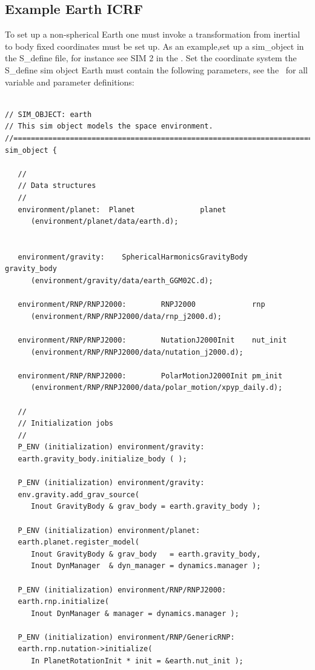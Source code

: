 \subsection{Example Earth ICRF }
To set up a non-spherical Earth one must invoke a transformation from inertial to body fixed coordinates must be set up. As an example,set up a sim\_object in the S\_define file, for instance see SIM 2 in the \hyperTutorial. Set the coordinate system the S\_define sim object Earth must contain the following parameters, see the \hyperTutorial\ for all variable and parameter definitions:

\begin{verbatim}

// SIM_OBJECT: earth
// This sim object models the space environment.
//=============================================================================
sim_object {

   //
   // Data structures
   //
   environment/planet:  Planet               planet
      (environment/planet/data/earth.d);


   environment/gravity:    SphericalHarmonicsGravityBody   gravity_body
      (environment/gravity/data/earth_GGM02C.d);

   environment/RNP/RNPJ2000:        RNPJ2000             rnp
      (environment/RNP/RNPJ2000/data/rnp_j2000.d);

   environment/RNP/RNPJ2000:        NutationJ2000Init    nut_init
      (environment/RNP/RNPJ2000/data/nutation_j2000.d);

   environment/RNP/RNPJ2000:        PolarMotionJ2000Init pm_init 
      (environment/RNP/RNPJ2000/data/polar_motion/xpyp_daily.d);
      
   //
   // Initialization jobs
   //
   P_ENV (initialization) environment/gravity:
   earth.gravity_body.initialize_body ( );

   P_ENV (initialization) environment/gravity:
   env.gravity.add_grav_source(
      Inout GravityBody & grav_body = earth.gravity_body );

   P_ENV (initialization) environment/planet:
   earth.planet.register_model(
      Inout GravityBody & grav_body   = earth.gravity_body,
      Inout DynManager  & dyn_manager = dynamics.manager );
 
   P_ENV (initialization) environment/RNP/RNPJ2000:
   earth.rnp.initialize(
      Inout DynManager & manager = dynamics.manager );
   
   P_ENV (initialization) environment/RNP/GenericRNP:
   earth.rnp.nutation->initialize(
      In PlanetRotationInit * init = &earth.nut_init );
 

\end{verbatim}
